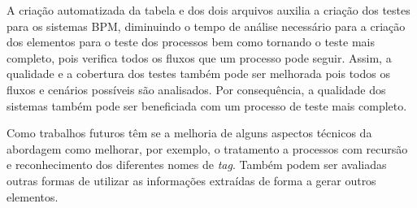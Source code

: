 \documentclass[12pt]{article}
\begin{document}
A criação automatizada da tabela e dos dois arquivos auxilia a criação dos testes para os sistemas BPM, diminuindo o tempo de análise necessário para a criação dos elementos para o teste dos processos bem como tornando o teste mais completo, pois verifica todos os fluxos que um processo pode seguir. Assim, a qualidade e a cobertura dos testes também pode ser melhorada pois todos os fluxos e cenários possíveis são analisados. Por consequência, a qualidade dos sistemas também pode ser beneficiada com um processo de teste mais completo.

Como trabalhos futuros têm se a melhoria de alguns aspectos técnicos da abordagem como melhorar, por exemplo, o tratamento a processos com recursão e reconhecimento dos diferentes nomes de \emph{tag}. Também podem ser avaliadas outras formas de utilizar as informações extraídas de forma a gerar outros elementos.
 




\end{document}
